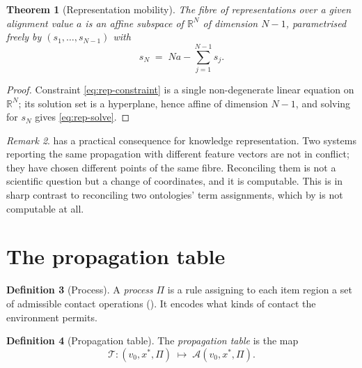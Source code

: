 \documentclass[11pt,twocolumn,a4paper]{article}
\theoremstyle{thmstyle}
\newtheorem{theorem}{Theorem}[section]
\theoremstyle{definition}
\newtheorem{definition}[theorem]{Definition}
\theoremstyle{remark}
\newtheorem{remark}[theorem]{Remark}
\newcommand{\R}{\mathbb{R}}
\newcommand{\acc}{\mathcal{A}}
\newcommand{\Proc}{\Pi}
\newcommand{\Tab}{\mathcal{T}}
\begin{document}
\begin{theorem}[Representation mobility]
\label{thm:rep-mobility}
The fibre of representations over a given alignment value $a$ is an
affine subspace of $\R^N$ of dimension $N-1$, parametrised freely by
$(s_1,\dots,s_{N-1})$ with
\begin{equation}
  s_N \;=\; N a - \sum_{j=1}^{N-1} s_j .
  \label{eq:rep-solve}
\end{equation}
\end{theorem}

\begin{proof}
Constraint \eqref{eq:rep-constraint} is a single non-degenerate linear
equation on $\R^N$; its solution set is a hyperplane, hence affine of
dimension $N-1$, and solving for $s_N$ gives \eqref{eq:rep-solve}.
\end{proof}

\begin{remark}
 has a practical consequence for knowledge
representation. Two systems reporting the same propagation with
different feature vectors are not in conflict; they have chosen
different points of the same fibre. Reconciling them is not a
scientific question but a change of coordinates, and it is
computable. This is in sharp contrast to reconciling two ontologies'
term assignments, which by  is not computable at
all.
\end{remark}

\section{The propagation table}
\label{sec:table}

\begin{definition}[Process]
\label{def:process}
A \emph{process} $\Proc$ is a rule assigning to each item region a set
of admissible contact operations (). It encodes
what kinds of contact the environment permits.
\end{definition}

\begin{definition}[Propagation table]
\label{def:table}
The \emph{propagation table} is the map
\begin{equation}
  \Tab \colon (v_0, x^{*}, \Proc) \;\longmapsto\;
  \acc(v_0, x^{*}, \Proc).
  \label{eq:table}
\end{equation}
\end{definition}
\end{document}
